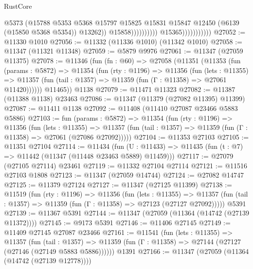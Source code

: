 \begin{lexlean}{RustCore}
\begin{coremodule}
                                                @5373
                                                (@15788
                                                  @5353
                                                  @5368
                                                  @15797
                                                  @15825
                                                  @15831
                                                  @15847
                                                  @12450
                                                  (@6139 (@15850 @5368 @5354))
                                                  @13262))
                                              @15858))))))))))
                          @15365)))))))))))
@27052 := @11330 @1010
@27056 := @11332 (@11336 @1010) (@11342 @1010)
@27058 := @11347 (@11321 @11348)
@27059 := @5879 @9976
@27061 := @11347 (@27059 @11375)
@27078 := @11346
    (fun (fn : @60) =>
    @27058
      (@11351
        (@11353
          (fun (params : @5872) =>
          @11354
            (fun (rty : @1196) =>
            @11356
              (fun (lets : @11355) =>
              @11357 (fun (tail : @1357) => @11359 (fun (Γ : @11358) => @27061 @11420))))))
        @11465))
    @1138
@27079 := @11471 @11323
@27082 := @11387 (@11388 @1138) @23463
@27086 := @11347 (@11379 (@27082 @11395) @11399)
@27087 := @11411 @1138
@27092 := @11408 (@11410 @27087 @23466 @5883 @5886)
@27103 := fun (params : @5872) =>
  @11354
    (fun (rty : @1196) =>
    @11356
      (fun (lets : @11355) =>
      @11357 (fun (tail : @1357) => @11359 (fun (Γ : @11358) => @27061 (@27086 @27092)))))
@27104 := @11353 @27103
@27105 := @11351 @27104
@27114 := @11434
    (fun (U : @11433) => @11435 (fun (t : @7) => @11442 (@11347 (@11448 @23463 @5889) @11459)))
@27117 := @27079 (@27105 @27114) @23461
@27119 := @11332 @27104 @27114
@27121 := @11516 @27103 @1808
@27123 := @11347 (@27059 @14744)
@27124 := @27082 @14747
@27125 := @11379 @27124
@27127 := @11347 (@27125 @11399)
@27138 := @11519
    (fun (rty : @1196) =>
    @11356
      (fun (lets : @11355) =>
      @11357 (fun (tail : @1357) => @11359 (fun (Γ : @11358) => @27123 (@27127 @27092)))))
    @5391
@27139 := @11367 @5391
@27144 := @11347 (@27059 (@11364 (@14742 (@27139 @11372))))
@27145 := @9173 @5391
@27146 := @11406 @27145
@27149 := @11409 @27145 @27087 @23466
@27161 := @11541
    (fun (lets : @11355) =>
    @11357
      (fun (tail : @1357) =>
      @11359 (fun (Γ : @11358) => @27144 (@27127 (@27146 (@27149 @5883 @5886))))))
    @1391
@27166 := @11347 (@27059 (@11364 (@14742 (@27139 @12778))))

\end{coremodule}
\end{lexlean}

